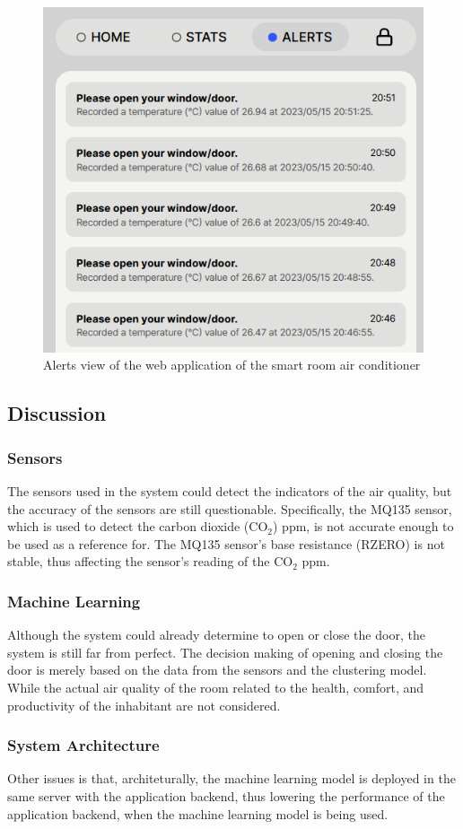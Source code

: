 \begin{figure}
      \centerline{\includegraphics[scale=0.5]{resources/webapp-alerts-view.png}}
      \caption{Alerts view of the web application of the smart room air conditioner}
      \label{webapp-alerts-view}
\end{figure}

\subsection{Discussion}
\subsubsection{Sensors}
The sensors used in the system could detect the
indicators of the air quality, but the accuracy
of the sensors are still questionable.
Specifically, the MQ135 sensor, which is used to
detect the carbon dioxide (CO$_2$) ppm, is not
accurate enough to be used as a reference for.
The MQ135 sensor's base resistance (RZERO) is
not stable, thus affecting the sensor's
reading of the CO$_2$ ppm.

\subsubsection{Machine Learning}
Although the system could already determine to open
or close the door, the system is still far from
perfect. The decision making of opening and closing
the door is merely based on the data from the
sensors and the clustering model. While the actual
air quality of the room related to the health,
comfort, and productivity of the inhabitant are not
considered.

\subsubsection{System Architecture}
Other issues is that, architeturally, the machine
learning model is deployed in the same server with
the application backend, thus lowering the
performance of the application backend, when the
machine learning model is being used.

